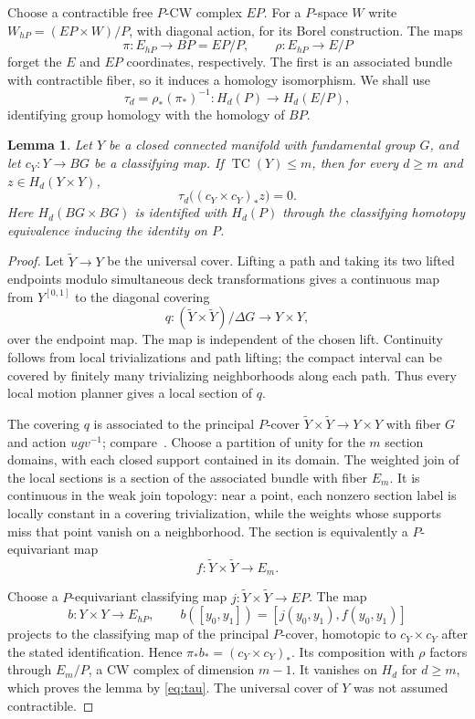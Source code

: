 \documentclass[11pt]{article}
\newtheorem{lemma}[theorem]{Lemma}
\theoremstyle{remark}
\newcommand{\TC}{\operatorname{TC}}
\begin{document}
Choose a contractible free \(P\)-CW complex \(EP\). For a \(P\)-space \(W\)
write \(W_{hP}=(EP\times W)/P\), with diagonal action, for its Borel
construction. The maps
\[
 \pi:E_{hP}\longrightarrow BP=EP/P,\qquad
 \rho:E_{hP}\longrightarrow E/P
\]
forget the \(E\) and \(EP\) coordinates, respectively. The first is an
associated bundle with contractible fiber, so it induces a homology
isomorphism. We shall use
\begin{equation}\label{eq:tau}
 \tau_d=\rho_*(\pi_*)^{-1}:
 H_d(P)\longrightarrow H_d(E/P),
\end{equation}
identifying group homology with the homology of \(BP\).

\begin{lemma}\label{lem:planner}
Let \(Y\) be a closed connected manifold with fundamental group \(G\),
and let \(c_Y:Y\to BG\) be a classifying map. If \(\TC(Y)\leq m\), then
for every \(d\geq m\) and \(z\in H_d(Y\times Y)\),
\[
 \tau_d\big((c_Y\times c_Y)_*z\big)=0.
\]
Here \(H_d(BG\times BG)\) is identified with \(H_d(P)\) through the
classifying homotopy equivalence inducing the identity on \(P\).
\end{lemma}

\begin{proof}
Let \(\widetilde Y\to Y\) be the universal cover. Lifting a path and taking
its two lifted endpoints modulo simultaneous deck transformations gives
a continuous map from \(Y^{[0,1]}\) to the diagonal covering
\[
 q:(\widetilde Y\times\widetilde Y)/\Delta G
       \longrightarrow Y\times Y,
\]
over the endpoint map. The map is independent of the chosen lift.
Continuity follows from local trivializations and path lifting; the
compact interval can be covered by finitely many trivializing
neighborhoods along each path. Thus every local motion planner gives a
local section of \(q\).

The covering \(q\) is associated to the principal \(P\)-cover
\(\widetilde Y\times\widetilde Y\to Y\times Y\) with fiber \(G\)
and action \(ugv^{-1}\); compare~\cite[proof of Theorem 2.1]{FGLO}.
Choose a partition of unity for the \(m\) section domains, with each
closed support contained in its domain. The weighted join of the local
sections is a section of the associated bundle with fiber \(E_m\).
It is continuous in the weak join topology: near a point, each nonzero
section label is locally constant in a covering trivialization, while
the weights whose supports miss that point vanish on a neighborhood.
The section is equivalently a \(P\)-equivariant map
\[
 f:\widetilde Y\times\widetilde Y\longrightarrow E_m.
\]

Choose a \(P\)-equivariant classifying map
\(j:\widetilde Y\times\widetilde Y\to EP\).
The map
\[
 b:Y\times Y\longrightarrow E_{hP},\qquad
 b([y_0,y_1])=[j(y_0,y_1),f(y_0,y_1)]
\]
projects to the classifying map of the principal \(P\)-cover, homotopic
to \(c_Y\times c_Y\) after the stated identification. Hence
\(\pi_*b_*=(c_Y\times c_Y)_*\). Its composition with \(\rho\) factors
through \(E_m/P\), a CW complex of dimension \(m-1\).
It vanishes on \(H_d\) for \(d\geq m\), which proves the lemma by
\eqref{eq:tau}. The universal cover of \(Y\) was not assumed contractible.
\end{proof}
\end{document}

